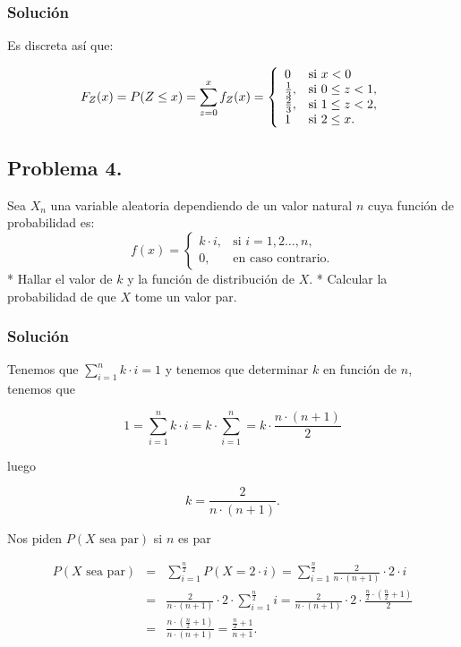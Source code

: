 \documentclass[
]{article}
\begin{document}
\hypertarget{soluciuxf3n-2}{%
\subsubsection{Solución}\label{soluciuxf3n-2}}

Es discreta así que:

\[F_Z(x)=P(Z\leq x)= \sum_{z=0}^x f_Z (x)=
\left\{\begin{array}{ll}
0 & \mbox{si }  x<0 \\
{1\over 3}, & \mbox{si } 0\leq z< 1,\\ 
{2\over 3}, & \mbox{si } 1\leq z< 2,\\ 
1 & \mbox{si }  2 \leq x.
\end{array}\right.
\]

\hypertarget{problema-4.}{%
\subsection{Problema 4.}\label{problema-4.}}

Sea \(X_n\) una variable aleatoria dependiendo de un valor natural \(n\)
cuya función de probabilidad es: \[
f(x)=\begin{cases}
k\cdot i, & \mbox{si }i=1,2\ldots,n, \\
0, & \mbox{en caso contrario.}
\end{cases}
\] * Hallar el valor de \(k\) y la función de distribución de \(X\). *
Calcular la probabilidad de que \(X\) tome un valor par.

\hypertarget{soluciuxf3n-3}{%
\subsubsection{Solución}\label{soluciuxf3n-3}}

Tenemos que \(\sum_{i=1}^n k\cdot i=1\) y tenemos que determinar \(k\)
en función de \(n\), tenemos que

\[
1=\sum_{i=1}^n k\cdot i= k\cdot \sum_{i=1}^n = k\cdot \frac{n\cdot (n+1)}{2}
\]

luego

\[k= \frac{2}{n\cdot (n+1)}.\]

Nos piden \(P(X\mbox{ sea par})\) si \(n\) es par

\begin{eqnarray*}
P(X\mbox{ sea par})&=&\sum_{i=1}^{\frac{n}{2}} P(X=2\cdot i)=
\sum_{i=1}^{\frac{n}{2}}  \frac{2}{n\cdot (n+1)}\cdot 2\cdot i\\
&=& \frac{2}{n\cdot (n+1)}\cdot2 \cdot  \sum_{i=1}^{\frac{n}{2}} i=
\frac{2}{n\cdot (n+1)}\cdot2 \cdot  \frac{\frac{n}{2}\cdot (\frac{n}{2}+1)}{2}\\
&=& \frac{n\cdot (\frac{n}{2}+1)}{n\cdot(n+1)}=
\frac{\frac{n}{2}+1}{n+1}.
\end{eqnarray*}
\end{document}
